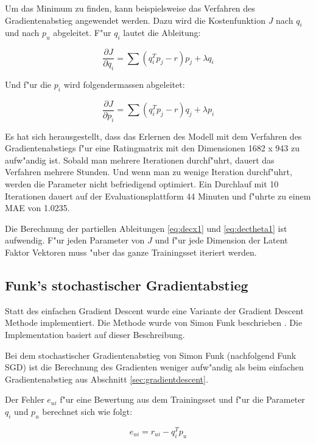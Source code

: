 \documentclass[a4paper, 12pt]{article}
\begin{document}
Um das Minimum zu finden, kann beispielsweise das Verfahren des Gradientenabstieg angewendet werden. Dazu wird die Kostenfunktion $J$ nach $q_i$ und nach $p_u$ abgeleitet. F"ur $q_i$ lautet die Ableitung:

\begin{equation}
  \label{eq:decx1}
  \frac{ \partial J }{ \partial q_i } = \sum (q_i^T p_j - r) p_j + \lambda q_i
\end{equation}

Und f"ur die $p_i$ wird folgendermassen abgeleitet:

\begin{equation}
  \label{eq:dectheta1}
  \frac{ \partial J }{ \partial p_i } = \sum (q_i^T p_j - r) q_j + \lambda p_i
\end{equation}

Es hat sich herausgestellt, dass das Erlernen des Modell mit dem Verfahren des Gradientenabstiegs f"ur eine Ratingmatrix mit den Dimensionen 1682 x 943 zu aufw"andig ist. Sobald man mehrere Iterationen durchf"uhrt, dauert das Verfahren mehrere Stunden. Und wenn man zu wenige Iteration durchf"uhrt, werden die Parameter nicht befriedigend optimiert. Ein Durchlauf mit 10 Iterationen dauert auf der Evaluationsplattform 44 Minuten und f"uhrte zu einem MAE von 1.0235.

Die Berechnung der partiellen Ableitungen \ref{eq:decx1} und \ref{eq:dectheta1} ist aufwendig. F"ur jeden Parameter von $J$ und f"ur jede Dimension der Latent Faktor Vektoren muss "uber das ganze Trainingsset iteriert werden.

\subsection{Funk's stochastischer Gradientabstieg}
\label{sec:funksvd}

Statt des einfachen Gradient Descent wurde eine Variante der Gradient Descent Methode implementiert. Die Methode wurde von Simon Funk beschrieben \cite{funk}. Die Implementation basiert auf dieser Beschreibung.

Bei dem stochastischer Gradientenabstieg von Simon Funk (nachfolgend Funk SGD) ist die Berechnung des Gradienten weniger aufw"andig als beim einfachen Gradientenabstieg aus Abschnitt \ref{sec:gradientdescent}.

Der Fehler $e_{ui}$ f"ur eine Bewertung aus dem Trainingsset und f"ur die Parameter $q_i$ und $p_u$ berechnet sich wie folgt:

\begin{equation}
  \label{eq:error1}
  e_{ui} = r_{ui} - q_i^T p_u
\end{equation}
\end{document}
